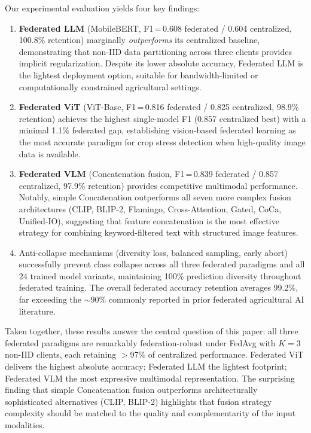 \documentclass[10pt,journal,compsoc]{IEEEtran}
\begin{document}
Our experimental evaluation yields four key findings:
\begin{enumerate}
    \item \textbf{Federated LLM} (MobileBERT, F1\,=\,0.608 federated / 0.604 centralized, 100.8\% retention) marginally \emph{outperforms} its centralized baseline, demonstrating that non-IID data partitioning across three clients provides implicit regularization. Despite its lower absolute accuracy, Federated LLM is the lightest deployment option, suitable for bandwidth-limited or computationally constrained agricultural settings.

    \item \textbf{Federated ViT} (ViT-Base, F1\,=\,0.816 federated / 0.825 centralized, 98.9\% retention) achieves the highest single-model F1 (0.857 centralized best) with a minimal 1.1\% federated gap, establishing vision-based federated learning as the most accurate paradigm for crop stress detection when high-quality image data is available.

    \item \textbf{Federated VLM} (Concatenation fusion, F1\,=\,0.839 federated / 0.857 centralized, 97.9\% retention) provides competitive multimodal performance. Notably, simple Concatenation outperforms all seven more complex fusion architectures (CLIP, BLIP-2, Flamingo, Cross-Attention, Gated, CoCa, Unified-IO), suggesting that feature concatenation is the most effective strategy for combining keyword-filtered text with structured image features.

    \item Anti-collapse mechanisms (diversity loss, balanced sampling, early abort) successfully prevent class collapse across all three federated paradigms and all 24 trained model variants, maintaining 100\% prediction diversity throughout federated training. The overall federated accuracy retention averages 99.2\%, far exceeding the ${\sim}90\%$ commonly reported in prior federated agricultural AI literature.
\end{enumerate}

Taken together, these results answer the central question of this paper: all three federated paradigms are remarkably federation-robust under FedAvg with $K{=}3$ non-IID clients, each retaining $>$97\% of centralized performance. Federated ViT delivers the highest absolute accuracy; Federated LLM the lightest footprint; Federated VLM the most expressive multimodal representation. The surprising finding that simple Concatenation fusion outperforms architecturally sophisticated alternatives (CLIP, BLIP-2) highlights that fusion strategy complexity should be matched to the quality and complementarity of the input modalities.
\end{document}
